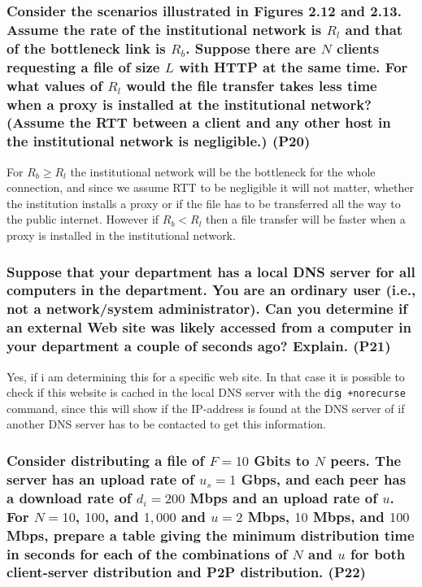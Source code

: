 \subsubsection{Consider the scenarios illustrated in Figures 2.12 and 2.13. Assume the rate of the institutional network is $R_l$ and that of the bottleneck link is $R_b$. Suppose there are $N$ clients requesting a file of size $L$ with HTTP at the same time. For what values of $R_l$ would the file transfer takes less time when a proxy is installed at the institutional network? (Assume the RTT between a client and any other host in the institutional network is negligible.) (P20)}

For $R_b \geq R_l$ the institutional network will be the bottleneck for the whole connection, and since we assume RTT to be negligible it will not matter, whether the institution installs a proxy or if the file has to be transferred all the way to the public internet. However if $R_b < R_l$ then a file transfer will be faster when a proxy is installed in the institutional network.


\subsubsection{Suppose that your department has a local DNS server for all computers in the department. You are an ordinary user (i.e., not a network/system administrator). Can you determine if an external Web site was likely accessed from a computer in your department a couple of seconds ago? Explain. (P21)}

Yes, if i am determining this for a specific web site. In that case it is possible to check if this website is cached in the local DNS server with the \texttt{dig +norecurse} command, since this will show if the IP-address is found at the DNS server of if another DNS server has to be contacted to get this information.


\subsubsection{Consider distributing a file of $F = 10$ Gbits to $N$ peers. The server has an upload rate of $u_s = 1$ Gbps, and each peer has a download rate of $d_i = 200$ Mbps and an upload rate of $u$. For $N = 10$, $100$, and $1,000$ and $u = 2$ Mbps, $10$ Mbps, and $100$ Mbps, prepare a table giving the minimum distribution time in seconds for each of the combinations of $N$ and $u$ for both client-server distribution and P2P distribution. (P22)}


